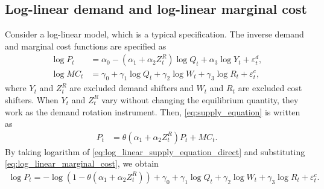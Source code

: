 \documentclass[11pt, a4paper]{article}
\theoremstyle{remark}
\begin{document}
\subsection{Log-linear demand and log-linear marginal cost}
Consider a log-linear model, which is a typical specification.
The inverse demand and marginal cost functions are specified as
\begin{align}
    \log P_{t} &= \alpha_0 - (\alpha_1 + \alpha_2 Z^{R}_{t}) \log Q_t + \alpha_3 \log Y_t + \varepsilon^{d}_{t},\label{eq:log_linear_demand}\\
    \log MC_t &= \gamma_0 + \gamma_1 \log Q_t +  \gamma_2 \log W_{t} + \gamma_3 \log R_t + \varepsilon^{c}_{t},\label{eq:log_linear_marginal_cost}
\end{align}
where $Y_{t}$ and $Z_t^R$ are excluded demand shifters and $W_t$ and $R_t$ are excluded cost shifters.
When $Y_{t}$ and $Z_{t}^{R}$ vary without changing the equilibrium quantity, they work as the demand rotation instrument.  
Then, \eqref{eq:supply_equation} is written as
\begin{align}
    P_t &= \theta (\alpha_1 + \alpha_2 Z^{R}_{t}) P_t + MC_t.\label{eq:log_linear_supply_equation_direct}
\end{align}
By taking logarithm of \eqref{eq:log_linear_supply_equation_direct} and substituting \eqref{eq:log_linear_marginal_cost}, we obtain
\begin{align}
    \log P_t = - \log(1 - \theta(\alpha_1 + \alpha_2 Z^{R}_{t})) + \gamma_0 + \gamma_1 \log Q_t +  \gamma_2 \log W_{t} + \gamma_3 \log R_t + \varepsilon^{c}_{t}. \label{eq:log_linear_supply_equation}
\end{align}

\end{document}

